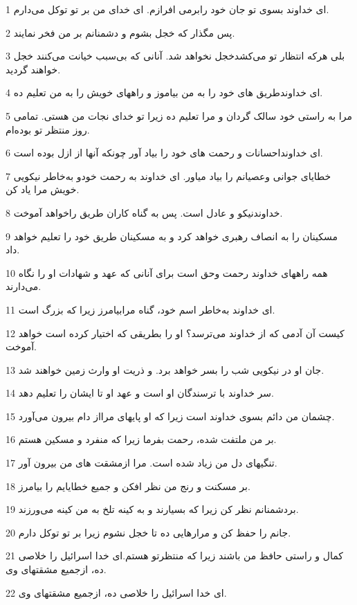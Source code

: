 \par 1 ای خداوند بسوی تو جان خود رابرمی افرازم. ای خدای من بر تو توکل می‌دارم.
\par 2 پس مگذار که خجل بشوم و دشمنانم بر من فخر نمایند.
\par 3 بلی هر‌که انتظار تو می‌کشدخجل نخواهد شد. آنانی که بی‌سبب خیانت می‌کنند خجل خواهند گردید.
\par 4 ‌ای خداوندطریق های خود را به من بیاموز و راههای خویش را به من تعلیم ده.
\par 5 مرا به راستی خود سالک گردان و مرا تعلیم ده زیرا تو خدای نجات من هستی. تمامی روز منتظر تو بوده‌ام.
\par 6 ‌ای خداونداحسانات و رحمت های خود را بیاد آور چونکه آنها از ازل بوده است.
\par 7 خطایای جوانی وعصیانم را بیاد میاور. ای خداوند به رحمت خودو به‌خاطر نیکویی خویش مرا یاد کن.
\par 8 خداوندنیکو و عادل است. پس به گناه کاران طریق راخواهد آموخت. 
\par 9 مسکینان را به انصاف رهبری خواهد کرد و به مسکینان طریق خود را تعلیم خواهد داد.
\par 10 همه راههای خداوند رحمت وحق است برای آنانی که عهد و شهادات او را نگاه می‌دارند.
\par 11 ‌ای خداوند به‌خاطر اسم خود، گناه مرابیامرز زیرا که بزرگ است.
\par 12 کیست آن آدمی که از خداوند می‌ترسد؟ او را بطریقی که اختیار کرده است خواهد آموخت.
\par 13 جان او در نیکویی شب را بسر خواهد برد. و ذریت او وارث زمین خواهند شد.
\par 14 سر خداوند با ترسندگان او است و عهد او تا ایشان را تعلیم دهد.
\par 15 چشمان من دائم بسوی خداوند است زیرا که او پایهای مرااز دام بیرون می‌آورد.
\par 16 بر من ملتفت شده، رحمت بفرما زیرا که منفرد و مسکین هستم.
\par 17 تنگیهای دل من زیاد شده است. مرا ازمشقت های من بیرون آور.
\par 18 بر مسکنت و رنج من نظر افکن و جمیع خطایایم را بیامرز.
\par 19 بردشمنانم نظر کن زیرا که بسیارند و به کینه تلخ به من کینه می‌ورزند.
\par 20 جانم را حفظ کن و مرارهایی ده تا خجل نشوم زیرا بر تو توکل دارم.
\par 21 کمال و راستی حافظ من باشند زیرا که منتظرتو هستم.‌ای خدا اسرائیل را خلاصی ده، ازجمیع مشقتهای وی.
\par 22 ‌ای خدا اسرائیل را خلاصی ده، ازجمیع مشقتهای وی.
 
